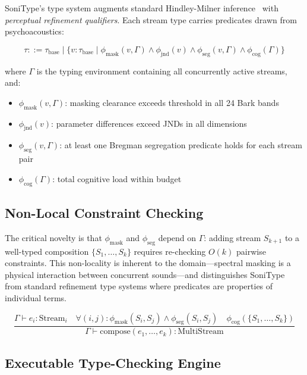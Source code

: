 \documentclass[sigchi, nonacm]{acmart}
\begin{document}
SoniType's type system augments standard Hindley-Milner inference~\cite{milner1978theory, damas1982principal} with \emph{perceptual refinement qualifiers}. Each stream type carries predicates drawn from psychoacoustics:

\begin{equation}
\tau ::= \tau_\mathrm{base} \mid \{ v : \tau_\mathrm{base} \mid \phi_\mathrm{mask}(v, \Gamma) \wedge \phi_\mathrm{jnd}(v) \wedge \phi_\mathrm{seg}(v, \Gamma) \wedge \phi_\mathrm{cog}(\Gamma) \}
\end{equation}

where $\Gamma$ is the typing environment containing all concurrently active streams, and:
\begin{itemize}
    \item $\phi_\mathrm{mask}(v, \Gamma)$: masking clearance exceeds threshold in all 24 Bark bands
    \item $\phi_\mathrm{jnd}(v)$: parameter differences exceed JNDs in all dimensions
    \item $\phi_\mathrm{seg}(v, \Gamma)$: at least one Bregman segregation predicate holds for each stream pair
    \item $\phi_\mathrm{cog}(\Gamma)$: total cognitive load within budget
\end{itemize}

\subsection{Non-Local Constraint Checking}

The critical novelty is that $\phi_\mathrm{mask}$ and $\phi_\mathrm{seg}$ depend on $\Gamma$: adding stream $S_{k+1}$ to a well-typed composition $\{S_1, \ldots, S_k\}$ requires re-checking $O(k)$ pairwise constraints. This non-locality is inherent to the domain---spectral masking is a physical interaction between concurrent sounds---and distinguishes SoniType from standard refinement type systems where predicates are properties of individual terms.

\begin{equation}
\frac{\Gamma \vdash e_i : \mathrm{Stream}_i \quad \forall (i,j): \phi_\mathrm{mask}(S_i, S_j) \wedge \phi_\mathrm{seg}(S_i, S_j) \quad \phi_\mathrm{cog}(\{S_1,\ldots,S_k\})}{\Gamma \vdash \mathrm{compose}(e_1, \ldots, e_k) : \mathrm{MultiStream}}
\end{equation}

\subsection{Executable Type-Checking Engine}
\label{sec:typechecker_impl}
\end{document}
